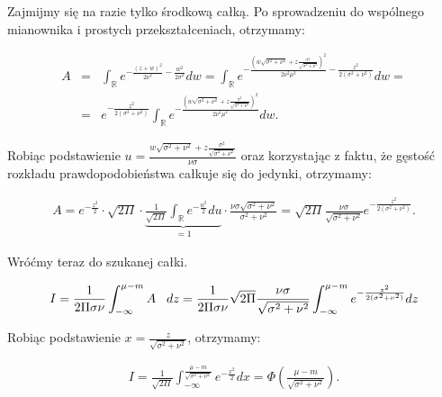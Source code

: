\documentclass{mini}
\begin{document}
Zajmijmy się na razie tylko środkową całką. Po sprowadzeniu do wspólnego mianownika i prostych przekształceniach, otrzymamy:

\begin{eqnarray*}
A &=& \int_\mathbb{R} e^{-\frac{(z+w)^2}{2\nu^2} - \frac{w^2}{2\sigma^2}} dw
=
\int_\mathbb{R} e^{-\frac{\left(w\sqrt{\sigma^2+\nu^2} + z\frac{\sigma^2}{\sqrt{\sigma^2+\nu^2}}\right)^2}{2\nu^2\mu^2} - \frac{z^2}{2(\sigma^2+\nu^2)}} dw=\\
&=&
e^{- \frac{z^2}{2(\sigma^2+\nu^2)}}\int_\mathbb{R} e^{-\frac{\left(w\sqrt{\sigma^2+\nu^2} + z\frac{\sigma^2}{\sqrt{\sigma^2+\nu^2}}\right)^2}{2\nu^2\mu^2}} dw.
\end{eqnarray*}

Robiąc podstawienie $u = \frac{w\sqrt{\sigma^2+\nu^2} + z\frac{\sigma^2}{\sqrt{\sigma^2+\nu^2}}}{\nu\sigma}$ oraz korzystając z faktu, że gęstość rozkładu prawdopodobieństwa całkuje się do jedynki, otrzymamy:

\begin{eqnarray*}
A = e^{-\frac{z^2}{2}}\cdot \sqrt{2\Pi}\cdot \underbrace{\frac{1}{\sqrt{2\Pi}} \int_{\mathbb{R}} e^{-\frac{u^2}{2}} du}_{=1} \cdot\frac{\nu\sigma\sqrt{\sigma^2+\nu^2}}{\sigma^2+\nu^2}
=
\sqrt{2\Pi}\frac{\nu\sigma}{\sqrt{\sigma^2+\nu^2}}e^{-\frac{z^2}{2(\sigma^2+\nu^2)}}.
\end{eqnarray*}

Wróćmy teraz do szukanej całki.

\begin{eqnarray*}
I = 
\frac{1}{2\Pi\sigma\nu} \int_{-\infty}^{\mu-m} A\hspace{3mm} dz
=
\frac{1}{2\Pi\sigma\nu} \sqrt{2\Pi}\frac{\nu\sigma}{\sqrt{\sigma^2+\nu^2}}  \int_{-\infty}^{\mu-m} e^{-\frac{z^2}{2(\sigma^2+\nu^2)}} dz
\end{eqnarray*}

Robiąc podstawienie $x = \frac{z}{\sqrt{\sigma^2+\nu^2}}$, otrzymamy:

\begin{eqnarray*}
I = 
\frac{1}{\sqrt{2\Pi}}\int_{-\infty}^{\frac{\mu-m}{\sqrt{\sigma^2+\nu^2}}} e^{-\frac{x^2}{2}} dx = \Phi \left(   \frac{\mu-m}{\sqrt{\sigma^2+\nu^2}}  \right).
\end{eqnarray*}

\end{document}

